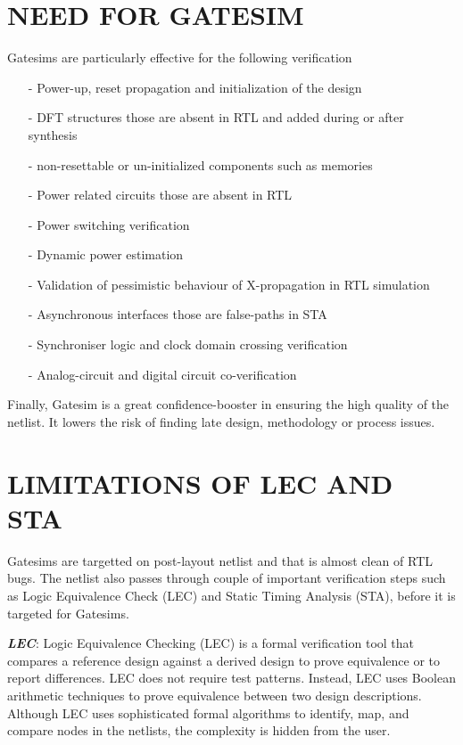 \section {NEED FOR GATESIM}
Gatesims are particularly effective for the following verification
\begin{itemize}
	\item[-]Power-up, reset propagation and initialization of the design
	\item[-]DFT structures those are absent in RTL and added during or after synthesis
	\item[-]non-resettable or un-initialized components such as memories
	\item[-]Power related circuits those are absent in RTL
	\item[-]Power switching verification
	\item[-]Dynamic power estimation
	\item[-]Validation of pessimistic behaviour of X-propagation in RTL simulation
	\item[-]Asynchronous interfaces those are false-paths in STA
	\item[-]Synchroniser logic and clock domain crossing verification
	\item[-]Analog-circuit and digital circuit co-verification
\end{itemize}

Finally, Gatesim is a great confidence-booster in ensuring the high quality of the netlist. It lowers the risk of finding late design, methodology or process issues.




\section{LIMITATIONS OF LEC AND STA}

Gatesims are targetted on post-layout netlist and that is almost clean of RTL bugs. The netlist also passes through couple of important verification steps such as Logic Equivalence Check (LEC) and Static Timing Analysis (STA), before it is targeted for Gatesims.

\emph {\bf LEC}: Logic Equivalence Checking (LEC) is a formal verification tool that compares a reference design against a derived design to prove equivalence or to report differences.  LEC does not require test patterns. Instead, LEC uses Boolean arithmetic techniques to prove equivalence between two design descriptions. Although LEC uses sophisticated formal algorithms to identify, map, and compare nodes in the netlists, the complexity is hidden from the user. %

